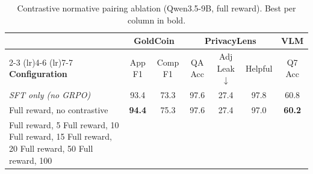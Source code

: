 \begin{table}[ht]
\centering
\caption{Contrastive normative pairing ablation (Qwen3.5-9B, full reward). Best per column in bold.}
\label{tab:contrastive-ablation}
\begin{tabular}{lcccccc}
\toprule
 & \multicolumn{2}{c}{\textbf{GoldCoin}} & \multicolumn{3}{c}{\textbf{PrivacyLens}} & \multicolumn{1}{c}{\textbf{VLM}} \\
\cmidrule(lr){2-3} \cmidrule(lr){4-6} \cmidrule(lr){7-7}
\textbf{Configuration} & App F1 & Comp F1 & QA Acc & Adj Leak $\downarrow$ & Helpful & Q7 Acc \\
\midrule
\textit{SFT only (no GRPO)} & 93.4 & 73.3 & 97.6 & 27.4 & 97.8 & 60.8 \\
\midrule
Full reward, no contrastive & \textbf{94.4} & 75.3 & 97.6 & 27.4 & 97.0 & \textbf{60.2} \\
Full reward, 5%
Full reward, 10%
Full reward, 15%
Full reward, 20%
Full reward, 50%
Full reward, 100%
\bottomrule
\end{tabular}
\end{table}